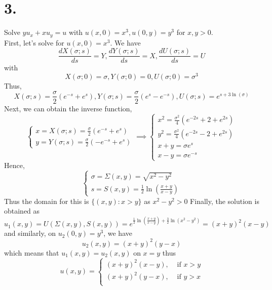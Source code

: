 \documentclass[11pt]{article}
\theoremstyle{mystyle}
\theoremstyle{definition}
\begin{document}
\section*{3.}
Solve $yu_x + xu_y = u$ with $u(x,0) = x^3, u(0,y) = y^3$ for $x,y > 0$. \\ 
First, let's solve for $u(x,0) = x^3$. We have 
\[
  \displaystyle\frac{dX(\sigma; s)}{ds} = Y, 
  \displaystyle\frac{dY(\sigma; s)}{ds} = X, 
  \displaystyle\frac{dU(\sigma; s)}{ds} = U
\]
with 
\[
  X(\sigma;0) = \sigma, Y(\sigma;0) = 0, U(\sigma;0) = \sigma^3
\]
Thus, 
\[
  X(\sigma; s) = \displaystyle\frac{\sigma}{2} (e^{-s} + e^s), Y(\sigma;s) = \displaystyle\frac{\sigma}{2} (e^s - e^{-s}), U(\sigma;s) = e^{s + 3\ln(\sigma)}
\]
Next, we can obtain the inverse function, 
\[
  \begin{cases}
    x = X(\sigma;s) =  \displaystyle\frac{\sigma}{2} (e^{-s} + e^s) \\
    y = Y(\sigma;s) =  \displaystyle\frac{\sigma}{2} (- e^{-s} + e^s)
  \end{cases}
  \implies
  \begin{cases}
    x^2 = \displaystyle\frac{\sigma^2}{4} (e^{-2s} + 2 + e^{2s}) \\
    y^2 = \displaystyle\frac{\sigma^2}{4} (e^{-2s} - 2 + e^{2s}) \\
    x + y = \sigma e^s \\
    x - y = \sigma e^{-s}
  \end{cases}
\]
Hence,  
\[
  \begin{cases}
    \sigma = \Sigma(x,y) = \sqrt{x^2 - y^2} \\
    s = S(x,y) =  \displaystyle\frac{1}{2} \ln \left(\displaystyle\frac{x+y}{x-y} \right)
  \end{cases}
\]
Thus the domain for this is $\{(x,y): x>y\}$ as $x^2-y^2 > 0$
Finally, the solution is obtained as 
\[
  u_1(x,y) = U(\Sigma(x,y), S(x,y)) = e^{\frac{1}{2} \ln\left( \frac{x+y}{x-y}\right) + \frac{3}{2} \ln(x^2-y^2)} = (x+y)^2(x -y) 
\]
and similarly, on $u_2(0,y) = y^3$, we have
\[
  u_2(x,y) = (x+y)^2(y-x)
\]
which means that $u_1(x,y) = u_2(x,y)$ on $x=y$ thus 
\[
  u(x,y) = 
  \begin{cases}
    (x+y)^2(x - y), &\text{ if } x > y\\
    (x+y)^2(y - x), &\text{ if } y > x\\ 
  \end{cases}
\]
\pagebreak
\end{document}
